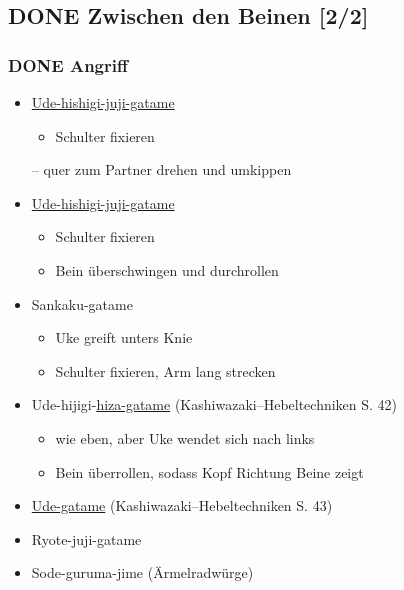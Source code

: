 \documentclass[11pt]{article}
\begin{document}
\subsection{{\bfseries\sffamily DONE} \label{orgd3451e7}Zwischen den Beinen [2/2]}
\label{sec:orgf6e1f1e}
\subsubsection{{\bfseries\sffamily DONE} Angriff}
\label{sec:org09e59e2}
\begin{itemize}
\item \hyperref[org4898d0b]{Ude-hishigi-juji-gatame}
\begin{itemize}
\item Schulter fixieren
\end{itemize}
– quer zum Partner drehen und umkippen
\item \hyperref[org4898d0b]{Ude-hishigi-juji-gatame}
\begin{itemize}
\item Schulter fixieren
\item Bein überschwingen und durchrollen
\end{itemize}
\item Sankaku-gatame
\begin{itemize}
\item Uke greift unters Knie
\item Schulter fixieren, Arm lang strecken
\end{itemize}
\item Ude-hijigi-\hyperref[orga0a2132]{hiza-gatame} (Kashiwazaki--Hebeltechniken S. 42)
\begin{itemize}
\item wie eben, aber Uke wendet sich nach links
\item Bein überrollen, sodass Kopf Richtung Beine zeigt
\end{itemize}
\item \hyperref[orgca3a14b]{Ude-gatame} (Kashiwazaki--Hebeltechniken S. 43)
\item Ryote-juji-gatame
\item Sode-guruma-jime (Ärmelradwürge)
\end{itemize}
\end{document}
